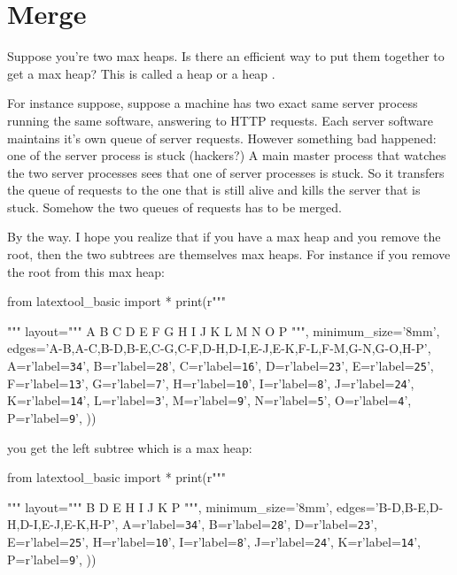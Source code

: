 \section{Merge}

Suppose you're two max heaps.
Is there an efficient way to put them together to get a max heap?
This is called a heap  or a heap .

For instance suppose, suppose a machine has
two exact same server process running the same software,
answering to HTTP requests.
Each server software maintains it's own queue of server requests.
However something bad happened: one of the server process is stuck
(hackers?)
A main master process that watches the two server processes
sees that one of server processes is stuck.
So it transfers the queue of requests to the one that is still alive
and kills the server that is stuck.
Somehow the two queues of requests has to be merged.

By the way.
I hope you realize that if you have a max heap and you remove the
root, then the two subtrees are themselves max heaps.
For instance if you remove the root from this max heap:

\begin{python}
from latextool_basic import *
print(r"""
\begin{center}
\end{center}
""" %
layout="""
        A 
    B       C 
  D   E   F   G
 H I J K L M N O
P
""",
minimum_size='8mm',
edges='A-B,A-C,B-D,B-E,C-G,C-F,D-H,D-I,E-J,E-K,F-L,F-M,G-N,G-O,H-P',
A=r'label=\texttt{34}',
B=r'label=\texttt{28}',
C=r'label=\texttt{16}',
D=r'label=\texttt{23}',
E=r'label=\texttt{25}',
F=r'label=\texttt{13}',
G=r'label=\texttt{7}',
H=r'label=\texttt{10}',
I=r'label=\texttt{8}',
J=r'label=\texttt{24}',
K=r'label=\texttt{14}',
L=r'label=\texttt{3}',
M=r'label=\texttt{9}',
N=r'label=\texttt{5}',
O=r'label=\texttt{4}',
P=r'label=\texttt{9}',
))
\end{python}

you get the left subtree which is a max heap:

\begin{python}
from latextool_basic import *
print(r"""
\begin{center}
\end{center}
""" %
layout="""
    B        
  D   E      
 H I J K 
P
""",
minimum_size='8mm',
edges='B-D,B-E,D-H,D-I,E-J,E-K,H-P',
A=r'label=\texttt{34}',
B=r'label=\texttt{28}',
D=r'label=\texttt{23}',
E=r'label=\texttt{25}',
H=r'label=\texttt{10}',
I=r'label=\texttt{8}',
J=r'label=\texttt{24}',
K=r'label=\texttt{14}',
P=r'label=\texttt{9}',
))
\end{python}

